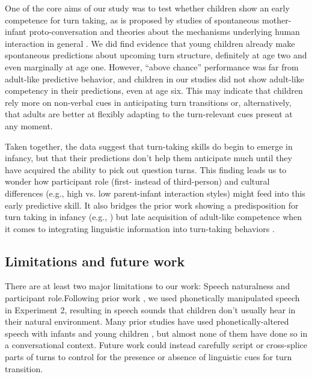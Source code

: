 \documentclass[authoryear, 12pt]{elsarticle}
\begin{document}
One of the core aims of our study was to test whether children show an early competence for turn taking, as is proposed by studies of spontaneous mother-infant proto-conversation and theories about the mechanisms underlying human interaction in general \citep{hilbrink2015, levinson2006}. We did find evidence that young children already make spontaneous predictions about upcoming turn structure, definitely at age two and even marginally at age one. However, ``above chance'' performance was far from adult-like predictive behavior, and children in our studies did not show adult-like competency in their predictions, even at age six. This may indicate that children rely more on non-verbal cues in anticipating turn transitions or, alternatively, that adults are better at flexibly adapting to the turn-relevant cues present at any moment.


Taken together, the data suggest that turn-taking skills do begin to emerge in infancy, but that their predictions don't help them anticipate much until they have acquired the ability to pick out question turns. This finding leads us to wonder how participant role (first- instead of third-person) and cultural differences (e.g., high vs. low parent-infant interaction styles) might feed into this early predictive skill. It also bridges the prior work showing a predisposition for turn taking in infancy (e.g., \citealp{hilbrink2015}) but late acquisition of adult-like competence when it comes to integrating linguistic information into turn-taking behaviors \citep{casillas2016, garvey1984, ervin-tripp1979}.

\subsection{Limitations and future work}

There are at least two major limitations to our work: Speech naturalness and participant role.Following prior work \citep{de-ruiter2006, keitel2013}, we used phonetically manipulated speech in Experiment 2, resulting in speech sounds that children don't usually hear in their natural environment. Many prior studies have used phonetically-altered speech with infants and young children \citep[cf.][]{jusczyk2000}, but almost none of them have done so in a conversational context. Future work could instead carefully script or cross-splice parts of turns to control for the presence or absence of linguistic cues for turn transition.
\end{document}

